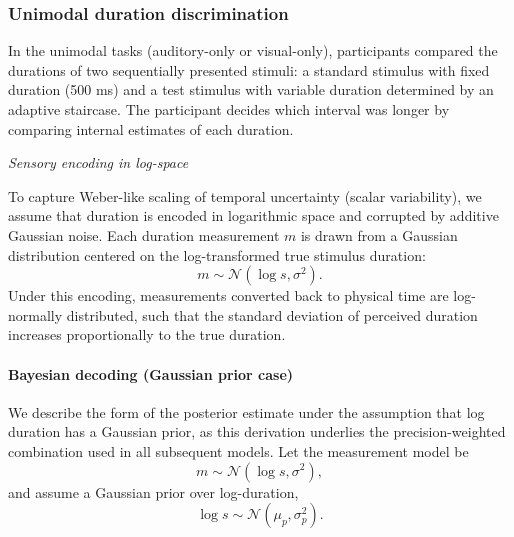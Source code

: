 \documentclass{jov}
\begin{document}
\subsubsection{Unimodal duration discrimination}

In the unimodal tasks (auditory-only or visual-only), participants compared the durations of two sequentially presented stimuli: a standard stimulus with fixed duration (500 ms) and a test stimulus with variable duration determined by an adaptive staircase. The participant decides which interval was longer by comparing internal estimates of each duration.


\textit{Sensory encoding in log-space}

To capture Weber-like scaling of temporal uncertainty (scalar variability), we assume that duration is encoded in logarithmic space and corrupted by additive Gaussian noise. Each duration measurement $m$ is drawn from a Gaussian distribution centered on the log-transformed true stimulus duration:
\begin{equation}
m \sim \mathcal{N}(\log s, \sigma^2).
\end{equation}
Under this encoding, measurements converted back to physical time are log-normally distributed, such that the standard deviation of perceived duration increases proportionally to the true duration.


\paragraph{Bayesian decoding (Gaussian prior case)}

We describe the form of the posterior estimate under the assumption that log duration has a Gaussian prior, as this derivation underlies the precision-weighted combination used in all subsequent models. 
Let the measurement model be
\begin{equation}
m \sim \mathcal{N}(\log s, \sigma^2),
\label{eq:likelihood}
\end{equation}
and assume a Gaussian prior over log-duration,
\begin{equation}
\log s \sim \mathcal{N}(\mu_p, \sigma_p^2).
\label{eq:prior}
\end{equation}
\end{document}
